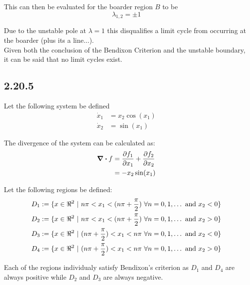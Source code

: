 \documentclass[letter]{article}
\begin{document}
This can then be evaluated for the boarder region $B$ to be
\begin{equation}
	\lambda_{1,2} = \pm 1
\end{equation}

Due to the unstable pole at $\lambda = 1$ this disqualifies a limit cycle from occurring at the boarder (plus its a line...).\\

Given both the conclusion of the Bendixon Criterion and the unstable boundary, it can be said that no limit cycles exist.




\newpage
\subsection{2.20.5}
Let the following system be defined
\begin{equation}
	\begin{aligned}
		\dot{x}_1 &= x_2 \cos(x_1)\\
		\dot{x}_2 &= \sin(x_1)
	\end{aligned}
\end{equation}

The divergence of the system can be calculated as:
\begin{align}
	\div f  &= \pdv{f_1}{x_1} + \pdv{f_2}{x_2} \nonumber\\
	&= -x_2 \sin(x_1)
\end{align}

Let the following regions be defined:
\begin{equation}
	\begin{aligned}
		D_1 := \{x \in \real^2 \ | \ n \pi < x_1 < (n \pi +\frac{\pi}{2}) \ \forall n = 0, 1, \dots \text{ and } x_2 < 0\}\\
		D_2 := \{x \in \real^2 \ | \ n \pi < x_1 < (n \pi +\frac{\pi}{2}) \ \forall n = 0, 1, \dots \text{ and } x_2 > 0\}\\
		D_3 := \{x \in \real^2 \ | \ (n \pi +\frac{\pi}{2}) < x_1 < n \pi \ \forall n = 0, 1, \dots \text{ and } x_2 < 0\}\\
		D_4 := \{x \in \real^2 \ | \ (n \pi +\frac{\pi}{2}) < x_1 < n \pi \ \forall n = 0, 1, \dots \text{ and } x_2 > 0\}\\
	\end{aligned}
\end{equation}

Each of the regions individualy satisfy Bendixon's criterion as $D_1$ and $D_4$ are always positive while $D_2$ and $D_3$ are always negative.\\
\end{document}
